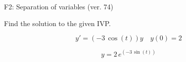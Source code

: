 \begin{exercise}
  \begin{exerciseTitle}F2: Separation of variables (ver. 74)\end{exerciseTitle}
  \begin{exerciseStatement}
    
Find the solution to the given IVP.

    
\[y'=( -3 \, \cos\left(t\right) )y\hspace{1em} y(0)= 2\]

  \end{exerciseStatement}
  \begin{exerciseAnswer}
    
\[y= 2 \, e^{\left(-3 \, \sin\left(t\right)\right)}\]

  \end{exerciseAnswer}
\end{exercise}